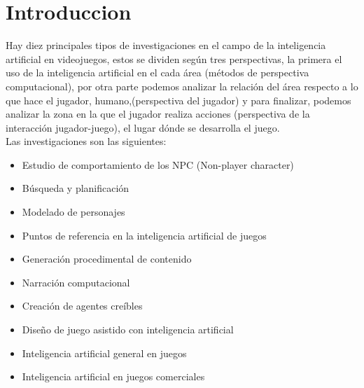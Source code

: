 %
%

\chapter[Introduccion]{
	Introduccion
}

Hay diez principales tipos de investigaciones en el campo de la inteligencia artificial en videojuegos, estos se dividen según tres perspectivas, la primera el uso de la inteligencia artificial en el cada área (métodos de perspectiva computacional), por otra parte podemos analizar la relación del área respecto a lo que hace el jugador, humano,(perspectiva del jugador) y para finalizar, podemos analizar la zona en la que el jugador realiza acciones (perspectiva de la interacción jugador-juego), el lugar dónde se desarrolla el juego.\\


Las investigaciones son las siguientes:\\

\begin{center}

	\begin{itemize}
	
		\item Estudio de comportamiento de los NPC (Non-player character)\\
		\item Búsqueda y planificación\\
		\item Modelado de personajes\\
		\item Puntos de referencia en la inteligencia artificial de juegos\\
		\item Generación procedimental de contenido\\
		\item Narración computacional\\
		\item Creación de agentes creíbles\\
		\item Diseño de juego asistido con inteligencia artificial\\
		\item Inteligencia artificial general en juegos\\
		\item Inteligencia artificial en juegos comerciales\\
		
	\end{itemize}

\end{center}

